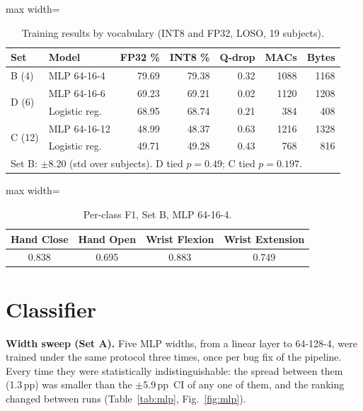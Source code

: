 \documentclass[11pt,a4paper]{article}
\newcommand{\pp}{\,pp}
\begin{document}
\begin{table}[htbp]\centering\small
\caption{Training results by vocabulary (INT8 and FP32, LOSO, 19 subjects).}\label{tab:vocab}
\begin{adjustbox}{max width=\linewidth}
\begin{tabular}{llrrrrr}\toprule
Set & Model & FP32 \% & INT8 \% & Q-drop & MACs & Bytes\\\midrule
\multirow{1}{*}{B (4)} & MLP 64-16-4 & 79.69 & 79.38 & 0.32 & 1088 & 1168\\
\multirow{2}{*}{D (6)} & MLP 64-16-6 & 69.23 & 69.21 & 0.02 & 1120 & 1208\\
 & Logistic reg. & 68.95 & 68.74 & 0.21 & 384 & 408\\
\multirow{2}{*}{C (12)} & MLP 64-16-12 & 48.99 & 48.37 & 0.63 & 1216 & 1328\\
 & Logistic reg. & 49.71 & 49.28 & 0.43 & 768 & 816\\\bottomrule
\multicolumn{7}{l}{\footnotesize Set B: $\pm$8.20 (std over subjects). D tied $p=0.49$; C tied $p=0.197$.}
\end{tabular}\end{adjustbox}
\end{table}

\begin{table}[htbp]\centering\small
\caption{Per-class F1, Set B, MLP 64-16-4.}\label{tab:f1}
\begin{adjustbox}{max width=\linewidth}
\begin{tabular}{cccc}\toprule
Hand Close & Hand Open & Wrist Flexion & Wrist Extension\\\midrule
0.838 & 0.695 & 0.883 & 0.749\\\bottomrule
\end{tabular}\end{adjustbox}
\end{table}

\section{Classifier}\label{sec:classifier}
\textbf{Width sweep (Set A).} Five MLP widths, from a linear layer to 64-128-4, were trained under the
same protocol three times, once per bug fix of the pipeline. Every time they were statistically
indistinguishable: the spread between them (1.3\pp) was smaller than the $\pm$5.9\pp\ CI of any one
of them, and the ranking changed between runs (Table~\ref{tab:mlp}, Fig.~\ref{fig:mlp}).
\end{document}
